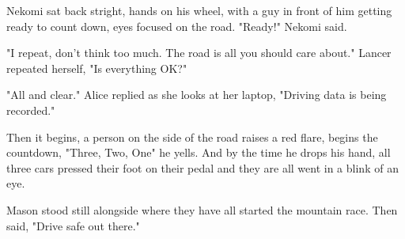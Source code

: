 Nekomi sat back stright, hands on his wheel, with a guy in front of him getting ready to count down, eyes focused on the road. "Ready!" Nekomi said.

"I repeat, don't think too much. The road is all you should care about." Lancer repeated herself, "Is everything OK?"

"All and clear." Alice replied as she looks at her laptop, "Driving data is being recorded."

Then it begins, a person on the side of the road raises a red flare, begins the countdown, "Three, Two, One" he yells. And by the time he drops his hand, all three cars pressed their foot on their pedal and they are all went in a blink of an eye.

Mason stood still alongside where they have all started the mountain race. Then said, "Drive safe out there."

